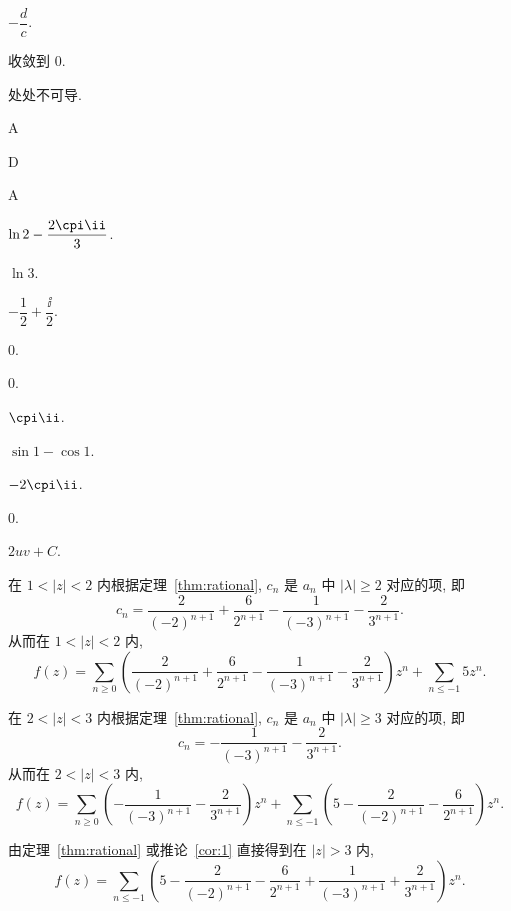 \exans $-\dfrac dc$.

\exans 收敛到 $0$.



\setcounter{exer}{0}

\exans 处处不可导.

\exans A

\exans D

\exans A

\exans $\ln 2-\dfrac{2\cpi\ii}3$.

\exans $\ln 3$.



\setcounter{exer}{0}

\exans $-\dfrac12+\dfrac\ii2$.

\exans \delspace\begin{enuminline}[(i)]
  \item $0$.
  \item $0$.
\end{enuminline}

\exans $\cpi\ii$.

\exans $\sin1-\cos 1$.

\exans $-2\cpi\ii$.

\exans $0$.

\exans $2uv+C$.


\setcounter{exer}{0}









\begin{solution}
  \begin{enumpar}
    \item 在 $1<|z|<2$ 内根据定理~\ref{thm:rational}, $c_n$ 是 $a_n$ 中 $|\lambda|\ge 2$ 对应的项, 即
  \[c_n=\frac2{(-2)^{n+1}}+\frac6{2^{n+1}}-\frac1{(-3)^{n+1}}-\frac2{3^{n+1}}.\]
  从而在 $1<|z|<2$ 内, 
  \[f(z)=\sum_{n\ge 0}\left(\frac2{(-2)^{n+1}}+\frac6{2^{n+1}}-\frac1{(-3)^{n+1}}-\frac2{3^{n+1}}\right)z^n+\sum_{n\le-1}5z^n.\]
      \item 在 $2<|z|<3$ 内根据定理~\ref{thm:rational}, $c_n$ 是 $a_n$ 中 $|\lambda|\ge 3$ 对应的项, 即
  \[c_n=-\frac1{(-3)^{n+1}}-\frac2{3^{n+1}}.\]
  从而在 $2<|z|<3$ 内, 
  \[f(z)=\sum_{n\ge 0}\left(-\frac1{(-3)^{n+1}}-\frac2{3^{n+1}}\right)z^n+\sum_{n\le-1}\left(5-\frac2{(-2)^{n+1}}-\frac6{2^{n+1}}\right)z^n.\]
    \item 由定理~\ref{thm:rational} 或推论~\ref{cor:1} 直接得到在 $|z|>3$ 内, 
  \[f(z)=\sum_{n\le-1}\left(5-\frac2{(-2)^{n+1}}-\frac6{2^{n+1}}+\frac1{(-3)^{n+1}}+\frac2{3^{n+1}}\right)z^n.\]    
  \end{enumpar}
\end{solution}
  